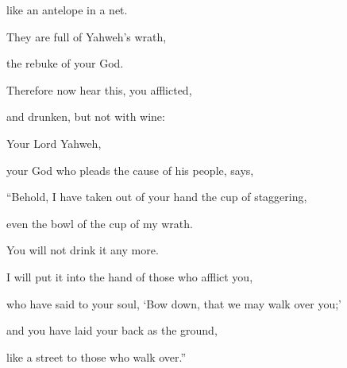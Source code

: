 {\par }{\QB like an antelope in a net.
\par }{\Q They are full of Yahweh’s wrath,
\par }{\QB the rebuke of your God.
\par }{\BB \par }{\Q {}Therefore now hear this, you afflicted,
\par }{\QB and drunken, but not with wine:
\par }{\Q {}Your Lord Yahweh,
\par }{\QB your God who pleads the cause of his people, says,
\par }{\Q “Behold, I have taken out of your hand the cup of staggering,
\par }{\QB even the bowl of the cup of my wrath.
\par }{\QB You will not drink it any more.
\par }{\Q {}I will put it into the hand of those who afflict you,
\par }{\QB who have said to your soul, ‘Bow down, that we may walk over you;’
\par }{\QB and you have laid your back as the ground,
\par }{\QB like a street to those who walk over.”

}
